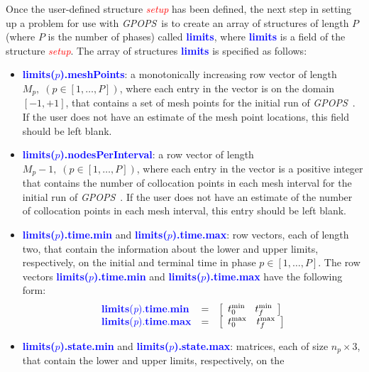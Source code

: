 \documentclass[10pt]{article}
\newcommand{\gpops}{{\em GPOPS}~}
\newcommand{\bfblue}[1]{\textcolor{blue}{\bf #1}}
\newcommand{\slred}[1]{\textcolor{red}{\sl #1}}
\begin{document}
Once the user-defined structure \slred{setup} has been defined, the next
step in setting up a problem for use with \gpops is to create
an array of structures of length $P$ (where $P$ is the number of
phases) called \bfblue{limits}, where \bfblue{limits} is a
field of the structure \slred{setup}.  The array of structures
\bfblue{limits} is specified as follows:
\begin{itemize}
 \item \bfblue{limits($p$).meshPoints}: a monotonically increasing
  row vector of length $M_p,\; (p\in[1,\ldots,P])$, where each entry
  in the vector is on the domain $[-1,+1]$, that contains a set of
  mesh points for the initial run of \gpops.  If the user does not
  have an estimate of the mesh point locations, this field should be
  left blank.  
 \item \bfblue{limits($p$).nodesPerInterval}: a row vector of length
   $M_p-1,\; (p\in[1,\ldots,P])$, where each entry in the vector is a
   positive integer that contains the number of collocation points in
   each mesh interval for the initial run of \gpops.  If the user does not
  have an estimate of the number of collocation points in each mesh
  interval, this entry should be left blank.  
\item \bfblue{limits($p$).time.min} and \bfblue{limits($p$).time.max}:
   row vectors, each of length two, that contain the information
   about the lower and upper limits, respectively, on the initial and terminal time in phase
   $p\in[1,\ldots,P]$.  The row vectors
   \bfblue{limits($p$).time.min} and \bfblue{limits($p$).time.max} have the following form:
   \begin{displaymath}
     \begin{array}{lcl}
       \bfblue{limits(\textit{p}).time.min} & = & \left[\begin{array}{cc} t_0^{\textrm{min}} &
           t_f^{\textrm{min}} \end{array} \right] \\
       \bfblue{limits(\textit{p}).time.max} & = & \left[\begin{array}{cc} t_0^{\textrm{max}} &
           t_f^{\textrm{max}} \end{array} \right]
     \end{array}
   \end{displaymath}
 \item \bfblue{limits($p$).state.min} and \bfblue{limits($p$).state.max}:
   matrices, each of size $n_p \times 3$,
   that contain the lower and upper limits, respectively, on the

\end{itemize}
\end{document}
